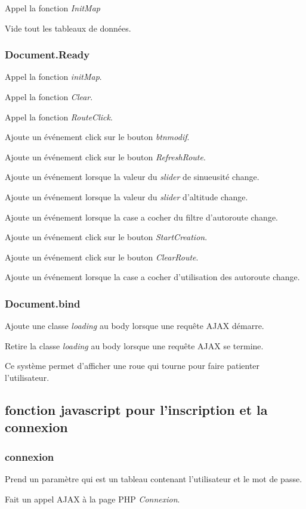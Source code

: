 \documentclass[a4paper]{article}
\begin{document}
Appel la fonction \emph{InitMap}

Vide tout les tableaux de données.

\subsubsection{Document.Ready}
Appel la fonction \emph{initMap}.

Appel la fonction \emph{Clear}.

Appel la fonction \emph{RouteClick}.

Ajoute un événement click sur le bouton \emph{btnmodif}.

Ajoute un événement click sur le bouton \emph{RefreshRoute}.

Ajoute un événement lorsque la valeur du \emph{slider} de sinueusité change.

Ajoute un événement lorsque la valeur du \emph{slider} d'altitude change.

Ajoute un événement lorsque la case a cocher du filtre d'autoroute change.

Ajoute un événement click sur le bouton \emph{StartCreation}.

Ajoute un événement click sur le bouton \emph{ClearRoute}.

Ajoute un événement lorsque la case a cocher d'utilisation des autoroute change.

\subsubsection{Document.bind}
Ajoute une classe \emph{loading} au body lorsque une requête AJAX démarre.

Retire la classe \emph{loading} au body lorsque une requête AJAX se termine.

Ce système permet d'afficher une roue qui tourne pour faire patienter l'utilisateur.

\subsection{fonction javascript pour l'inscription et la connexion}
\subsubsection{connexion}
Prend un paramètre qui est un tableau contenant l'utilisateur et le mot de passe.

Fait un appel AJAX à la page PHP \emph{Connexion}.
\end{document}
